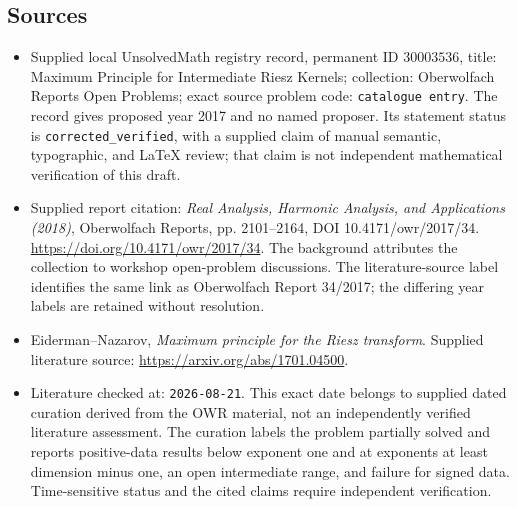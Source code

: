 \documentclass[11pt]{article}
\begin{document}
\subsection{Sources}
\begin{itemize}
\item Supplied local UnsolvedMath registry record, permanent ID \(30003536\), title: Maximum Principle for Intermediate Riesz Kernels; collection: Oberwolfach Reports Open Problems; exact source problem code: \texttt{catalogue entry}. The record gives proposed year 2017 and no named proposer. Its statement status is \texttt{corrected\_verified}, with a supplied claim of manual semantic, typographic, and LaTeX review; that claim is not independent mathematical verification of this draft.
\item Supplied report citation: \emph{Real Analysis, Harmonic Analysis, and Applications (2018)}, Oberwolfach Reports, pp. 2101--2164, DOI 10.4171/owr/2017/34. \url{https://doi.org/10.4171/owr/2017/34}. The background attributes the collection to workshop open-problem discussions. The literature-source label identifies the same link as Oberwolfach Report 34/2017; the differing year labels are retained without resolution.
\item Eiderman--Nazarov, \emph{Maximum principle for the Riesz transform}. Supplied literature source: \url{https://arxiv.org/abs/1701.04500}.
\item Literature checked at: \texttt{2026-08-21}. This exact date belongs to supplied dated curation derived from the OWR material, not an independently verified literature assessment. The curation labels the problem partially solved and reports positive-data results below exponent one and at exponents at least dimension minus one, an open intermediate range, and failure for signed data. Time-sensitive status and the cited claims require independent verification.
\end{itemize}
\end{document}
